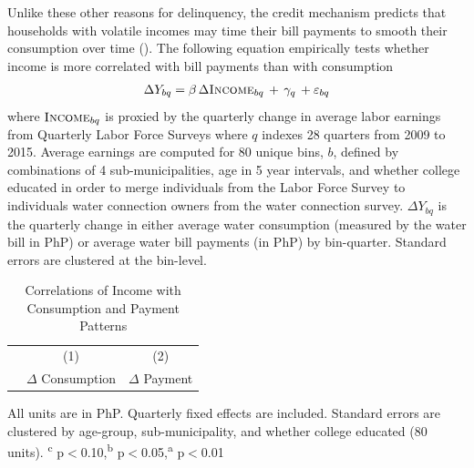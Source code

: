 \documentclass[12pt]{article}
\begin{document}


Unlike these other reasons for delinquency, the credit mechanism predicts that households with volatile incomes may time their bill payments to smooth their consumption over time (\cite{deaton1991saving}).  The following equation empirically tests whether income is more correlated with bill payments than with consumption
\begin{align*}
\Delta Y_{bq} = \beta\, \Delta \textsc{Income}_{bq} \,+\, \gamma_q \,+\varepsilon_{bq}
\end{align*}
where $\textsc{Income}_{bq}$ is proxied by the quarterly change in average labor earnings from Quarterly Labor Force Surveys where $q$ indexes 28 quarters from 2009 to 2015.  Average earnings are computed for 80 unique bins, $b$, defined by combinations of 4 sub-municipalities, age in 5 year intervals, and whether college educated in order to merge individuals from the Labor Force Survey to individuals water connection owners from the water connection survey.  $\Delta Y_{bq}$ is the quarterly change in either average water consumption (measured by the water bill in PhP) or average water bill payments (in PhP) by bin-quarter.  Standard errors are clustered at the bin-level.

\begin{table}[!ht]
\small
\centering
\begin{threeparttable}
\caption{Correlations of Income with Consumption and Payment Patterns}\label{table:lfsanalysis}
\vspace{-2mm}
\begin{tabular}{lcc}
\toprule
 & \small (1) & \small (2)  \\
 & \small $\Delta$ Consumption & \small $\Delta$ Payment \\[.5em]
 \toprule

\bottomrule
\end{tabular}
\begin{tablenotes}
\footnotesize
\item All units are in PhP.  Quarterly fixed effects are included.  Standard errors are clustered by age-group, sub-municipality, and whether college educated (80 units).  \textsuperscript{c} p$<$0.10,\textsuperscript{b} p$<$0.05,\textsuperscript{a} p$<$0.01 
\end{tablenotes}
\end{threeparttable}
\end{table}
\end{document}
